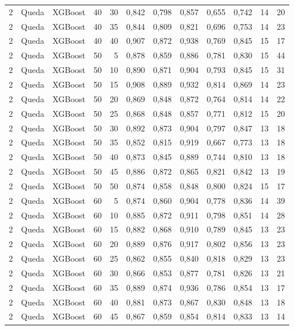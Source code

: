 \begin{longtable}{ccclrrrrrrrr}
2 & Queda & XGBoost & 40 & 30 & 0,842 & 0,798 & 0,857 & 0,655 & 0,742 & 14 & 20 \\
2 & Queda & XGBoost & 40 & 35 & 0,844 & 0,809 & 0,821 & 0,696 & 0,753 & 14 & 23 \\
2 & Queda & XGBoost & 40 & 40 & 0,907 & 0,872 & 0,938 & 0,769 & 0,845 & 15 & 17 \\
2 & Queda & XGBoost & 50 & 5 & 0,878 & 0,859 & 0,886 & 0,781 & 0,830 & 15 & 44 \\
2 & Queda & XGBoost & 50 & 10 & 0,890 & 0,871 & 0,904 & 0,793 & 0,845 & 15 & 31 \\
2 & Queda & XGBoost & 50 & 15 & 0,908 & 0,889 & 0,932 & 0,814 & 0,869 & 14 & 23 \\
2 & Queda & XGBoost & 50 & 20 & 0,869 & 0,848 & 0,872 & 0,764 & 0,814 & 14 & 22 \\
2 & Queda & XGBoost & 50 & 25 & 0,868 & 0,848 & 0,857 & 0,771 & 0,812 & 15 & 20 \\
2 & Queda & XGBoost & 50 & 30 & 0,892 & 0,873 & 0,904 & 0,797 & 0,847 & 13 & 18 \\
2 & Queda & XGBoost & 50 & 35 & 0,852 & 0,815 & 0,919 & 0,667 & 0,773 & 13 & 18 \\
2 & Queda & XGBoost & 50 & 40 & 0,873 & 0,845 & 0,889 & 0,744 & 0,810 & 13 & 18 \\
2 & Queda & XGBoost & 50 & 45 & 0,886 & 0,872 & 0,865 & 0,821 & 0,842 & 13 & 19 \\
2 & Queda & XGBoost & 50 & 50 & 0,874 & 0,858 & 0,848 & 0,800 & 0,824 & 15 & 17 \\
2 & Queda & XGBoost & 60 & 5 & 0,874 & 0,860 & 0,904 & 0,778 & 0,836 & 14 & 39 \\
2 & Queda & XGBoost & 60 & 10 & 0,885 & 0,872 & 0,911 & 0,798 & 0,851 & 14 & 28 \\
2 & Queda & XGBoost & 60 & 15 & 0,882 & 0,868 & 0,910 & 0,789 & 0,845 & 13 & 23 \\
2 & Queda & XGBoost & 60 & 20 & 0,889 & 0,876 & 0,917 & 0,802 & 0,856 & 13 & 23 \\
2 & Queda & XGBoost & 60 & 25 & 0,862 & 0,855 & 0,840 & 0,818 & 0,829 & 13 & 23 \\
2 & Queda & XGBoost & 60 & 30 & 0,866 & 0,853 & 0,877 & 0,781 & 0,826 & 13 & 21 \\
2 & Queda & XGBoost & 60 & 35 & 0,889 & 0,874 & 0,936 & 0,786 & 0,854 & 13 & 17 \\
2 & Queda & XGBoost & 60 & 40 & 0,881 & 0,873 & 0,867 & 0,830 & 0,848 & 13 & 18 \\
2 & Queda & XGBoost & 60 & 45 & 0,867 & 0,859 & 0,854 & 0,814 & 0,833 & 13 & 14 \\

\end{longtable}
